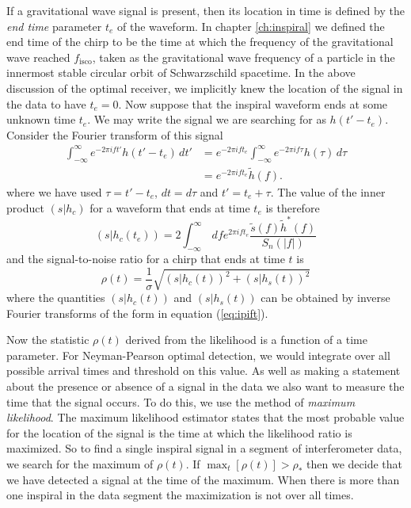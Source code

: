If a gravitational wave signal is present, then its location in time is
defined by the \emph{end time} parameter $t_e$ of the waveform. In chapter
\ref{ch:inspiral} we defined the end time of the chirp to be the time at which
the frequency of the gravitational wave reached $f_\mathrm{isco}$, taken as the
gravitational wave frequency of a particle in the innermost stable circular
orbit of Schwarzschild spacetime.  In the above discussion of the optimal
receiver, we implicitly knew the location of the signal in the data to have
$t_e = 0$. Now suppose that the inspiral waveform ends at some unknown time
$t_e$. We may write the signal we are searching for as $h(t'-t_e)$. Consider
the Fourier transform of this signal
\begin{equation}
\begin{split}
\int_{-\infty}^\infty e^{-2\pi i f t'} h(t'-t_e) \, dt' &= 
e^{-2\pi ift_e} \int_{-\infty}^\infty e^{-2\pi i f \tau} h(\tau) \, d\tau \\
&= e^{-2\pi ift_e} \tilde{h}(f).
\end{split}
\end{equation}
where we have used $\tau = t' - t_e$, $dt = d\tau$ and $t' = t_e + \tau$.
The value of the inner product $(s|h_c)$ for a waveform that ends at time $t_e$ is
therefore
\begin{equation}
(s|h_c(t_e)) = 2 \int_{-\infty}^\infty\,df e^{2\pi ift_e}
\frac{\tilde{s}(f)\tilde{h}^\ast(f)}{S_n(|f|)}
\label{eq:ipift}
\end{equation}
and the signal-to-noise ratio for a chirp that ends at time $t$ is
\begin{equation}
\rho(t) = \frac{1}{\sigma} \sqrt{ (s|h_c(t))^2 + (s|h_s(t))^2}
\end{equation}
where the quantities $(s|h_c(t))$ and $(s|h_s(t))$ can be obtained by inverse
Fourier transforms of the form in equation (\ref{eq:ipift}).

Now the statistic $\rho(t)$ derived from the likelihood is a function of a
time parameter. For Neyman-Pearson optimal detection, we would integrate over
all possible arrival times and threshold on this value. As well as making a
statement about the presence or absence of a signal in the data we also want
to measure the time that the signal occurs. To do this, we use the method of
\emph{maximum likelihood}\cite{helstrom:1995}.  The maximum likelihood
estimator states that the most probable value for the location of the signal
is the time at which the likelihood ratio is maximized.  So to find a single
inspiral signal in a segment of interferometer data, we search for the maximum
of $\rho(t)$. If $\max_t\left[\rho(t)\right] > \rho_\ast$ then we decide that
we have detected a signal at the time of the maximum. When there is more than
one inspiral in the data segment the maximization is not over all times.

